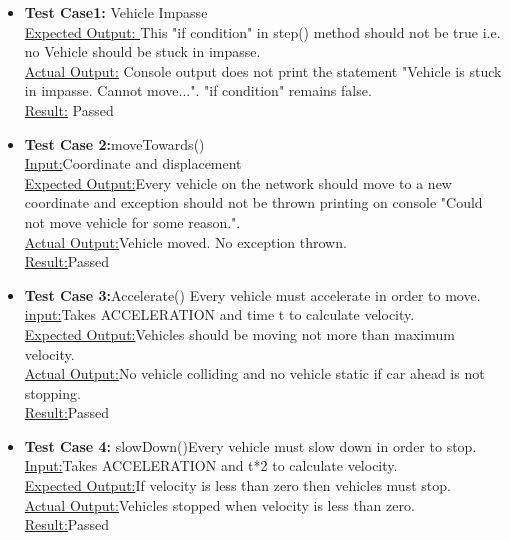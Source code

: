 \documentclass[11pt]{article}
\begin{document}
\begin{enumerate}
\begin{itemize}
\begin{enumerate}
\begin{itemize}
\item \textbf{Test Case1:} Vehicle Impasse\hfill \\
\underline{Expected Output: }This "if condition" in step() method should not be true i.e. no Vehicle should be stuck in impasse.\hfill \\
\underline{Actual Output:} Console output does not print the statement "Vehicle is stuck in impasse. Cannot move...". "if condition" remains false.\hfill \\
\underline{Result:} Passed\hfill \\

\item \textbf{Test Case 2:}moveTowards()\hfill \\
\underline{Input:}Coordinate and displacement\hfill \\
\underline{Expected Output:}Every vehicle on the network should move to a new coordinate and exception should not be thrown printing on console "Could not move vehicle for some reason.". \hfill \\
\underline{Actual Output:}Vehicle moved. No exception thrown.\hfill \\
\underline{Result:}Passed
\item \textbf{Test Case 3:}Accelerate() Every vehicle must accelerate in order to move.\hfill \\
\underline{input:}Takes ACCELERATION and time t to calculate velocity.\hfill \\
\underline{Expected Output:}Vehicles should be moving not more than maximum velocity.\hfill \\
\underline{Actual Output:}No vehicle colliding and no vehicle static if car ahead is not stopping.\hfill \\
\underline{Result:}Passed\hfill \\

\item \textbf{Test Case 4:} slowDown()Every vehicle must slow down in order to stop.\hfill \\
\underline{Input:}Takes ACCELERATION and t*2 to calculate velocity.\hfill \\
\underline{Expected Output:}If velocity is less than zero then vehicles must stop.\hfill \\
\underline{Actual Output:}Vehicles stopped when velocity is less than zero.\hfill \\
\underline{Result:}Passed\hfill \\
\end{itemize}


\end{enumerate}
\end{itemize}
\end{enumerate}
\end{document}
